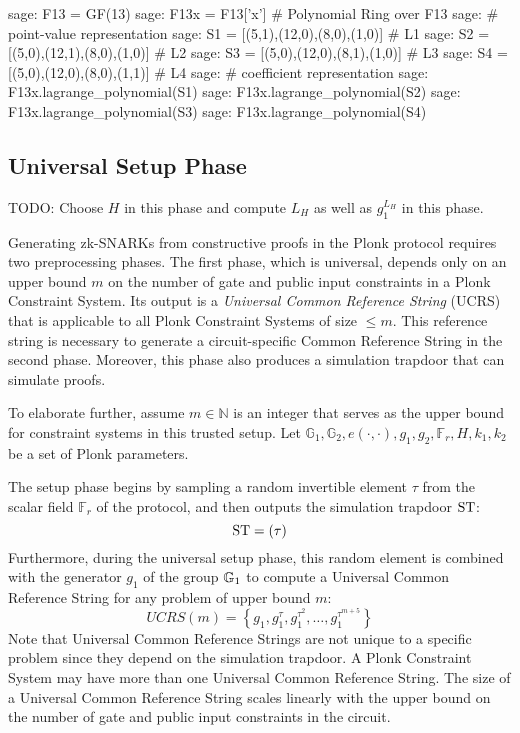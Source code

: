 \begin{example}
\begin{sagecommandline}
sage: F13 = GF(13)
sage: F13x = F13['x'] # Polynomial Ring over F13
sage: # point-value representation
sage: S1 = [(5,1),(12,0),(8,0),(1,0)] # L1
sage: S2 = [(5,0),(12,1),(8,0),(1,0)] # L2
sage: S3 = [(5,0),(12,0),(8,1),(1,0)] # L3
sage: S4 = [(5,0),(12,0),(8,0),(1,1)] # L4
sage: # coefficient representation
sage: F13x.lagrange_polynomial(S1)
sage: F13x.lagrange_polynomial(S2)
sage: F13x.lagrange_polynomial(S3)
sage: F13x.lagrange_polynomial(S4)
\end{sagecommandline}
\end{example}


\subsection{Universal Setup Phase}
TODO: Choose $H$ in this phase and compute $L_H$ as well as $g_1^{L_H}$ in this phase.


Generating zk-SNARKs from constructive proofs in the Plonk protocol requires two preprocessing phases. The first phase, which is universal, depends only on an upper bound $m$ on the number of gate and public input constraints in a Plonk Constraint System. Its output is a \textit{Universal Common Reference String} (UCRS) that is applicable to all Plonk Constraint Systems of size $\leq m$. This reference string is necessary to generate a circuit-specific Common Reference String in the second phase. Moreover, this phase also produces a simulation trapdoor that can simulate proofs.

To elaborate further, assume $m \in \mathbb{N}$ is an integer that serves as the upper bound for constraint systems in this trusted setup. Let ${\mathbb{G}_1, \mathbb{G}_2, e(\cdot,\cdot), g_1, g_2, \mathbb{F}_r, H, k_1,k_2}$ be a set of Plonk parameters.

The setup phase begins by sampling a random invertible element $\tau$ from the scalar field $\mathbb{F}_r$ of the protocol, and then outputs the simulation trapdoor $\mathbf{\mathrm{ST}}$:
\begin{equation}
\label{def:groth16-trapdoor}
\mathrm{ST} = (\tau)
\end{equation}
Furthermore, during the universal setup phase, this random element is combined with the generator $g_1$ of the group $\mathbb{G}_1$ to compute a Universal Common Reference String for any problem of upper bound $m$:
\begin{equation}
\label{def:plonk-ucrs}
UCRS(m) = \left\{g_1, g_1^{\tau}, g_1^{\tau^2},\ldots, g_1^{\tau^{m+5}}\right\}
\end{equation}
Note that Universal Common Reference Strings are not unique to a specific problem since they depend on the simulation trapdoor. A Plonk Constraint System may have more than one Universal Common Reference String. The size of a Universal Common Reference String scales linearly with the upper bound on the number of gate and public input constraints in the circuit.

